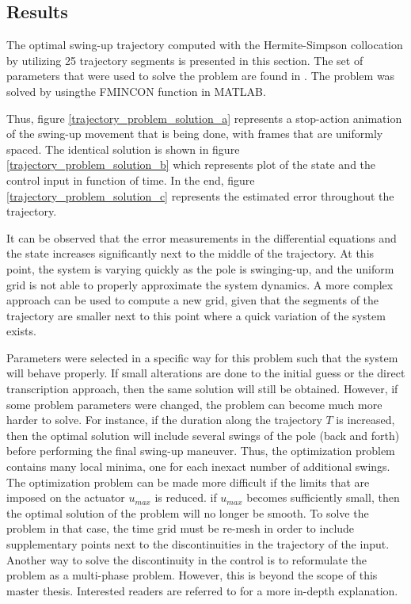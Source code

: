 \documentclass{thesisreport}
\begin{document}
\newpage

\subsection{Results}


The optimal swing-up trajectory computed with the Hermite-Simpson collocation by utilizing 25 trajectory segments is presented in this section. The set of parameters that were used to solve the problem are found in \cite{Kelly2017}. The problem was solved by usingthe FMINCON function in MATLAB.

Thus, figure \ref{trajectory_problem_solution_a} represents a stop-action animation of the swing-up movement that is being done, with frames that are uniformly spaced. The identical solution is shown in figure \ref{trajectory_problem_solution_b} which represents plot of the state and the control input in function of time. In the end, figure \ref{trajectory_problem_solution_c} represents the estimated error throughout the trajectory.

It can be observed that the error measurements in the differential equations and the state  increases significantly next to the middle of the trajectory.  At this point, the system is varying quickly as the pole is swinging-up, and the uniform grid is not able to properly approximate the system dynamics. A more complex approach can be used to compute a new grid, given that the segments of the trajectory are smaller next to this point where a quick variation of the system exists.

Parameters were selected in a specific way for this problem such that the system will behave properly. If small alterations are done to the initial guess or the direct transcription approach, then the same solution will still be obtained. However, if some problem parameters were changed, the problem can become much more harder to solve. For instance, if the duration along the trajectory $T$ is increased, then the optimal solution will include several swings of the pole (back and forth) before performing the final swing-up maneuver. Thus, the optimization problem contains many local minima, one for each inexact number of additional swings. The optimization problem can be made more difficult if the limits that are imposed on the actuator $u_{max}$ is reduced. if $u_{max}$ becomes sufficiently small, then the  optimal solution of the problem will no longer be smooth. To solve the problem in that case, the time grid must be re-mesh in order to include supplementary points next to the discontinuities in the trajectory of the input. Another way to solve the discontinuity in the control is to reformulate the problem as a multi-phase problem. However, this is beyond the scope of this master thesis. Interested readers are referred to \cite{Ernesto2013} for a more in-depth explanation. 
\end{document}

